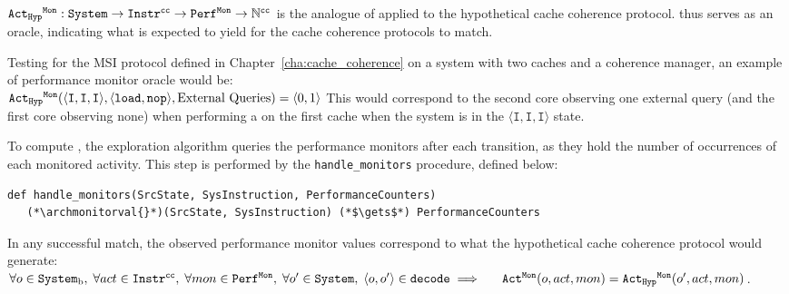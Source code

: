 \begin{definition}
\label{def:identifying:performance_monitor_oracle}
   $\text{\texttt{Act\textsubscript{Hyp}\textsuperscript{Mon}}}{}: \text{\texttt{System}}{} \to \text{\texttt{Instr}}{}^{\text{\texttt{cc}}}{}{} \to
   \text{\texttt{Perf\textsuperscript{Mon}}}{} \to \mathbb{N}^{\text{\texttt{cc}}}{}$ is the analogue of
   \archmonitorval{} applied to the hypothetical cache coherence protocol.
   \hyparchmonitorval{} thus serves as an oracle, indicating what
   \archmonitorval{} is expected to yield for the cache coherence protocols to
   match.
\end{definition}
\begin{example}
Testing for the MSI protocol defined in Chapter~\ref{cha:cache_coherence} on a
system with two caches and a coherence manager, an example of performance
monitor oracle would be:\\
$\text{\texttt{Act\textsubscript{Hyp}\textsuperscript{Mon}}}{}(\langle \texttt{I}, \texttt{I}, \texttt{I}\rangle, \langle
\text{\texttt{load}}{}, \text{\texttt{nop}}{} \rangle, \text{External Queries}) = \langle 0, 1
\rangle$
This would correspond to the second core observing one external query (and the
first core observing none) when performing a \loadinstr{} on the first cache
when the system is in the $\langle \texttt{I}, \texttt{I}, \texttt{I}\rangle$
state.
\end{example}

\iffalse
\begin{issue}[Definition of \archmonitorval{}]
   \label{issue:define_event_count}
   \archmonitorval{} is not originally known.
\end{issue}
\fi

\begin{step}
\label{step:behavior_matching}
   To compute \archmonitorval{}, the exploration algorithm queries the
   performance monitors after each transition, as they hold the number of
   occurrences of each monitored activity.  This step is performed by the
   \lstinline!handle_monitors!  procedure, defined below:

\begin{lstlisting}
def handle_monitors(SrcState, SysInstruction, PerformanceCounters)
   (*\archmonitorval{}*)(SrcState, SysInstruction) (*$\gets$*) PerformanceCounters
\end{lstlisting}
\end{step}

\begin{property}
\label{pro:behavior_simulation}
In any successful match, the observed performance monitor values correspond to
what the hypothetical cache coherence protocol would generate:\\
$
   \forallin{o}{\obssystemstate{}}{%
      \forallin{act}{\systemaction{}}{%
         \forallin{mon}{\archmonitor{}}{%
            \forallin{o'}{\systemstate{}}{%
               \langle o, o' \rangle \in \decodefun \implies\\
                  ~~\quad\archmonitorval{}(o, act, mon) =
                     \hyparchmonitorval{}(o', act, mon)
            }
         }
      }
   }
$.
\end{property}

